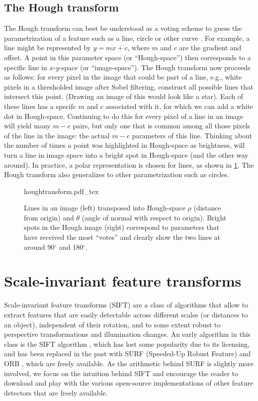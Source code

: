 \subsection{The Hough transform}
The Hough transform  can best be understood as a voting scheme to guess the parametrization of a feature such as a line, circle or other curve \cite{duda1972use}. For example, a line might be represented by $y=mx+c$, where $m$ and $c$ are the gradient and offset. A point in this parameter space (or ``Hough-space'') then corresponds to a specific line in $x$-$y$-space (or ``image-space''). The Hough transform now proceeds as follows: for every pixel in the image that could be part of a line, e.g., white pixels in a thresholded image after Sobel filtering, construct all possible lines that intersect this point. (Drawing an image of this would look like a star). Each of these lines has a specifc $m$ and $c$ associated with it, for which we can add a white dot in Hough-space. Continuing to do this for every pixel of a line in an image will yield many $m-c$ pairs, but only one that is common among all those pixels of the line in the image: the actual $m-c$ parameters of this line. Thinking about the number of times a point was highlighted in Hough-space as brightness, will turn a line in image space into a bright spot in Hough-space (and the other way around). In practice, a polar representation is chosen for lines, as shown in \cref{fig:hough}. The Hough transform also generalizes to other parametrization such as circles.

\begin{figure}
    \center
    \def\svgwidth{\textwidth}
    {houghtransform.pdf_tex}
    \caption{Lines in an image (left) transposed into Hough-space $\rho$ (distance from origin) and $\theta$ (angle of normal with respect to origin). Bright spots in the Hough image (right) correspond to parameters that have received the most ``votes'' and clearly show the two lines at around 90$^\circ$ and 180$^\circ$.\label{fig:hough}}
\end{figure}


\section{Scale-invariant feature transforms}
Scale-invariant feature transforms (SIFT) are a class of algorithms that allow to extract features that are easily detectable across different scales (or distances to an object), independent of their rotation, and to some extent robust to perspective transformations and illumination changes. An early algorithm in this class is the SIFT algorithm \cite{lowe1999object}, which has lost some popularity due to its licensing, and has been replaced in the past with SURF (Speeded-Up Robust Feature) \cite{bay2006surf} and ORB \cite{rublee2011orb}, which are freely available. As the arithmetic behind SURF is slightly more involved, we focus on the intuition behind SIFT and encourage the reader to download and play with the various open-source implementations of other feature detectors that are freely available.



